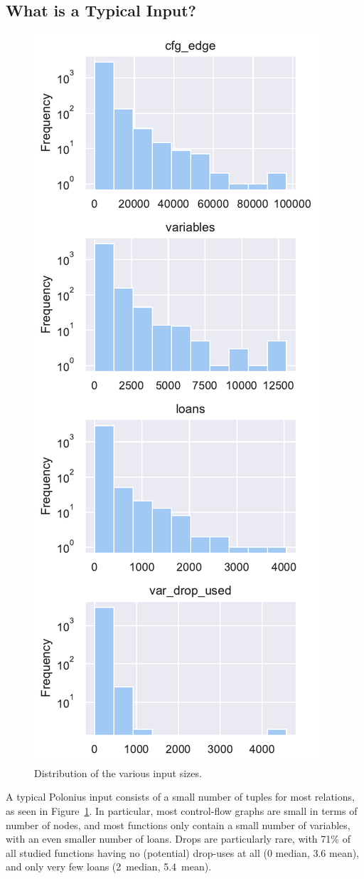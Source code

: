 \documentclass[11pt,a4paper,twoside,openany]{report}
\begin{document}
\subsection{What is a Typical Input?}\label{sec:inputs:inputs}

\begin{figure}
  \includegraphics[width=0.5\linewidth]{Graphs/input_sizes_dist.pdf}
  \caption{Distribution of the various input sizes.}
  \label{fig:input-sizes}
\end{figure}

A typical Polonius input consists of a small number of tuples for most
relations, as seen in Figure~\ref{fig:input-sizes}. In particular, most
control-flow graphs are small in terms of number of nodes, and most functions
only contain a small number of variables, with an even smaller number of loans.
Drops are particularly rare, with 71\% of all studied functions having no
(potential) drop-uses at all (0 median, 3.6 mean), and only very few loans
(2~median, 5.4~mean).
\end{document}
